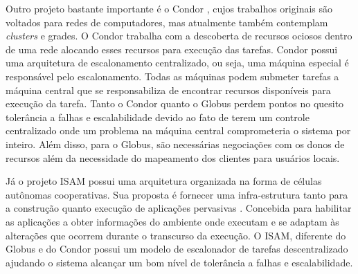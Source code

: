 Outro projeto bastante importante é o Condor \cite{condor2007}, cujos trabalhos originais são voltados para redes de computadores, mas atualmente também contemplam {\it clusters} e grades. O Condor trabalha com a descoberta de recursos ociosos dentro de uma rede alocando esses recursos para execução das tarefas. Condor possui uma arquitetura de escalonamento centralizado, ou seja, uma máquina especial é responsável pelo escalonamento. Todas as máquinas podem submeter tarefas a máquina central que se responsabiliza de encontrar recursos disponíveis para execução da tarefa. Tanto o Condor quanto o Globus perdem pontos no quesito tolerância a falhas e escalabilidade devido ao fato de terem um controle centralizado onde um problema na máquina central comprometeria o sistema por inteiro. Além disso, para o Globus, são necessárias negociações com os donos de recursos além da necessidade do mapeamento dos clientes para usuários locais.

Já o projeto ISAM \cite{isam} possui uma arquitetura organizada na forma de células autônomas cooperativas. Sua proposta é fornecer uma infra-estrutura tanto para a construção quanto execução de aplicações pervasivas \cite {isam}. Concebida para habilitar as aplicações a obter informações do ambiente onde executam e se adaptam às alterações que ocorrem durante o transcurso da execução. O ISAM, diferente do Globus e do Condor possui um modelo de escalonador de tarefas descentralizado ajudando o sistema alcançar um bom nível de tolerância a falhas e escalabilidade.
